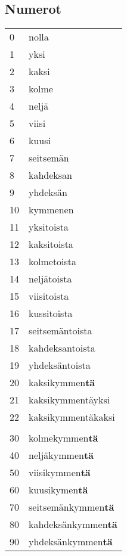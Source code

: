 \documentclass[../päätiedosto/pää.tex]{subfiles}
\begin{document}
\subsection{Numerot}
\label{num}
\begin{tabularx}{\textwidth}{XX}
0       & nolla              \\
1       & yksi               \\
2       & kaksi              \\
3       & kolme              \\
4       & neljä              \\
5       & viisi              \\
6       & kuusi              \\
7       & seitsemän          \\
8       & kahdeksan          \\
9       & yhdeksän           \\
10      & kymmenen           \\
11      & yksitoista         \\
12      & kaksitoista        \\
13      & kolmetoista        \\
14      & neljätoista        \\
15      & viisitoista        \\
16      & kussitoista        \\
17      & seitsemäntoista    \\
18      & kahdeksantoista    \\
19      & yhdeksäntoista     \\
20      & kaksikymmen\textbf{tä}      \\
21      & kaksikymmentäyksi  \\
22      & kaksikymmentäkaksi \\
        &                    \\
30      & kolmekymmen\textbf{tä}      \\
40      & neljäkymmen\textbf{tä}      \\
50      & viisikymmen\textbf{tä}      \\
60      & kuusikymen\textbf{tä}       \\
70      & seitsemänkymmen\textbf{tä}  \\
80      & kahdeksänkymmen\textbf{tä}  \\
90      & yhdeksänkymmen\textbf{tä}   \\

\end{tabularx}
\end{document}
